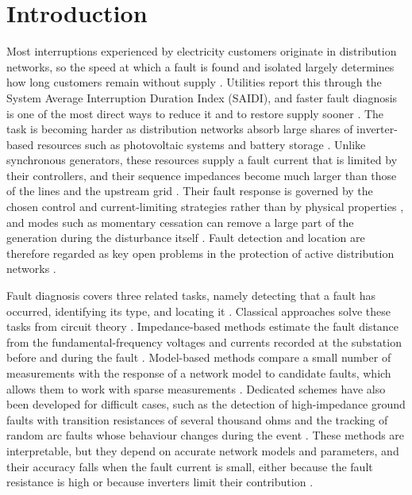 \documentclass[11pt]{article}
\newenvironment{nw}{}{}
\begin{document}

\section{Introduction}\label{sec1}

\begin{nw}
Most interruptions experienced by electricity customers originate in distribution networks, so the speed at which a fault is found and isolated largely determines how long customers remain without supply \cite{stefanidou2022,ngo2025deep}. Utilities report this through the System Average Interruption Duration Index (SAIDI), and faster fault diagnosis is one of the most direct ways to reduce it and to restore supply sooner \cite{stefanidou2022}. The task is becoming harder as distribution networks absorb large shares of inverter-based resources such as photovoltaic systems and battery storage \cite{abedi2026protection}. Unlike synchronous generators, these resources supply a fault current that is limited by their controllers, and their sequence impedances become much larger than those of the lines and the upstream grid \cite{yang2025protection}. Their fault response is governed by the chosen control and current-limiting strategies rather than by physical properties \cite{chakraborty2025influence}, and modes such as momentary cessation can remove a large part of the generation during the disturbance itself \cite{omran2025adaptive}. Fault detection and location are therefore regarded as key open problems in the protection of active distribution networks \cite{abedi2026protection}.

Fault diagnosis covers three related tasks, namely detecting that a fault has occurred, identifying its type, and locating it \cite{stefanidou2022}. Classical approaches solve these tasks from circuit theory \cite{kahnamouei2025mixed,rasoulnia2026comprehensive}. Impedance-based methods estimate the fault distance from the fundamental-frequency voltages and currents recorded at the substation before and during the fault \cite{moraflorez2008}. Model-based methods compare a small number of measurements with the response of a network model to candidate faults, which allows them to work with sparse measurements \cite{jamali2016,lv2023}. Dedicated schemes have also been developed for difficult cases, such as the detection of high-impedance ground faults with transition resistances of several thousand ohms \cite{liang2026high} and the tracking of random arc faults whose behaviour changes during the event \cite{liu2026real}. These methods are interpretable, but they depend on accurate network models and parameters, and their accuracy falls when the fault current is small, either because the fault resistance is high or because inverters limit their contribution \cite{yang2025protection}.


\end{nw}
\end{document}
